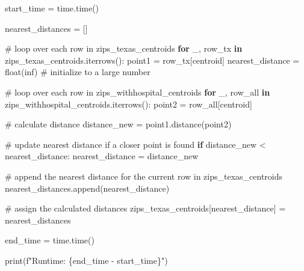 \documentclass[
  letterpaper,
  DIV=11,
  numbers=noendperiod]{scrartcl}
\newenvironment{Shaded}{\begin{snugshade}}{\end{snugshade}}
\newcommand{\BuiltInTok}[1]{\textcolor[rgb]{0.00,0.23,0.31}{#1}}
\newcommand{\CommentTok}[1]{\textcolor[rgb]{0.37,0.37,0.37}{#1}}
\newcommand{\ControlFlowTok}[1]{\textcolor[rgb]{0.00,0.23,0.31}{\textbf{#1}}}
\newcommand{\KeywordTok}[1]{\textcolor[rgb]{0.00,0.23,0.31}{\textbf{#1}}}
\newcommand{\NormalTok}[1]{\textcolor[rgb]{0.00,0.23,0.31}{#1}}
\newcommand{\OperatorTok}[1]{\textcolor[rgb]{0.37,0.37,0.37}{#1}}
\newcommand{\SpecialCharTok}[1]{\textcolor[rgb]{0.37,0.37,0.37}{#1}}
\newcommand{\SpecialStringTok}[1]{\textcolor[rgb]{0.13,0.47,0.30}{#1}}
\newcommand{\StringTok}[1]{\textcolor[rgb]{0.13,0.47,0.30}{#1}}
\begin{document}
\begin{Shaded}
\begin{Highlighting}[]
\NormalTok{start\_time }\OperatorTok{=}\NormalTok{ time.time()}

\NormalTok{nearest\_distances }\OperatorTok{=}\NormalTok{ []}

\CommentTok{\# loop over each row in zips\_texas\_centroids}
\ControlFlowTok{for}\NormalTok{ \_, row\_tx }\KeywordTok{in}\NormalTok{ zips\_texas\_centroids.iterrows():}
\NormalTok{    point1 }\OperatorTok{=}\NormalTok{ row\_tx[}\StringTok{\textquotesingle{}centroid\textquotesingle{}}\NormalTok{]}
\NormalTok{    nearest\_distance }\OperatorTok{=} \BuiltInTok{float}\NormalTok{(}\StringTok{\textquotesingle{}inf\textquotesingle{}}\NormalTok{)  }\CommentTok{\# initialize to a large number}

    \CommentTok{\# loop over each row in zips\_withhospital\_centroids}
    \ControlFlowTok{for}\NormalTok{ \_, row\_all }\KeywordTok{in}\NormalTok{ zips\_withhospital\_centroids.iterrows():}
\NormalTok{        point2 }\OperatorTok{=}\NormalTok{ row\_all[}\StringTok{\textquotesingle{}centroid\textquotesingle{}}\NormalTok{]}

        \CommentTok{\# calculate distance}
\NormalTok{        distance\_new }\OperatorTok{=}\NormalTok{ point1.distance(point2)}

        \CommentTok{\# update nearest distance if a closer point is found}
        \ControlFlowTok{if}\NormalTok{ distance\_new }\OperatorTok{\textless{}}\NormalTok{ nearest\_distance:}
\NormalTok{            nearest\_distance }\OperatorTok{=}\NormalTok{ distance\_new}

    \CommentTok{\# append the nearest distance for the current row in zips\_texas\_centroids}
\NormalTok{    nearest\_distances.append(nearest\_distance)}

\CommentTok{\# assign the calculated distances}
\NormalTok{zips\_texas\_centroids[}\StringTok{\textquotesingle{}nearest\_distance\textquotesingle{}}\NormalTok{] }\OperatorTok{=}\NormalTok{ nearest\_distances}

\NormalTok{end\_time }\OperatorTok{=}\NormalTok{ time.time()}

\BuiltInTok{print}\NormalTok{(}\SpecialStringTok{f"Runtime: }\SpecialCharTok{\{}\NormalTok{end\_time }\OperatorTok{{-}}\NormalTok{ start\_time}\SpecialCharTok{\}}\SpecialStringTok{"}\NormalTok{)}
\end{Highlighting}
\end{Shaded}
\end{document}

